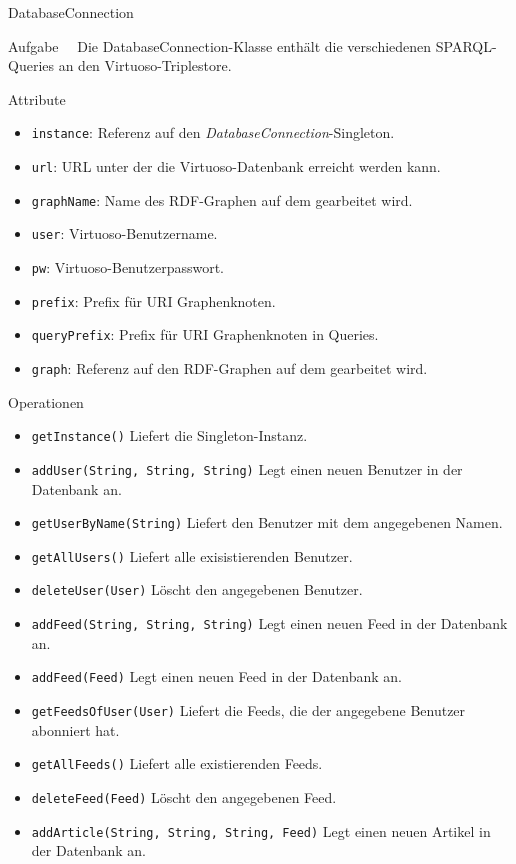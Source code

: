\begin{class}{20}{DatabaseConnection}
\item[Aufgabe]~\
Die DatabaseConnection-Klasse enthält die verschiedenen SPARQL-Queries an den Virtuoso-Triplestore.
\item[Attribute]~\
\begin{itemize}
  \item \texttt{instance}: Referenz auf den \textit{DatabaseConnection}-Singleton.
  \item \texttt{url}: URL unter der die Virtuoso-Datenbank erreicht werden kann.
  \item \texttt{graphName}: Name des RDF-Graphen auf dem gearbeitet wird.
  \item \texttt{user}: Virtuoso-Benutzername.
  \item \texttt{pw}: Virtuoso-Benutzerpasswort.
  \item \texttt{prefix}: Prefix für URI Graphenknoten.
  \item \texttt{queryPrefix}: Prefix für URI Graphenknoten in Queries.
  \item \texttt{graph}: Referenz auf den RDF-Graphen auf dem gearbeitet wird.
\end{itemize}
\item[Operationen]~\
\begin{itemize}
    \item \texttt{getInstance()}  Liefert die Singleton-Instanz.
    \item \texttt{addUser(String, String, String)} Legt einen neuen Benutzer in der Datenbank an.
    \item \texttt{getUserByName(String)} Liefert den Benutzer mit dem angegebenen Namen.
    \item \texttt{getAllUsers()} Liefert alle exisistierenden Benutzer.
    \item \texttt{deleteUser(User)} Löscht den angegebenen Benutzer.
    \item \texttt{addFeed(String, String, String)} Legt einen neuen Feed in der Datenbank an.
    \item \texttt{addFeed(Feed)} Legt einen neuen Feed in der Datenbank an.
    \item \texttt{getFeedsOfUser(User)} Liefert die Feeds, die der angegebene Benutzer abonniert hat.
    \item \texttt{getAllFeeds()} Liefert alle existierenden Feeds.
    \item \texttt{deleteFeed(Feed)} Löscht den angegebenen Feed.
    \item \texttt{addArticle(String, String, String, Feed)} Legt einen neuen Artikel in der Datenbank an.

\end{itemize}
\end{class}
